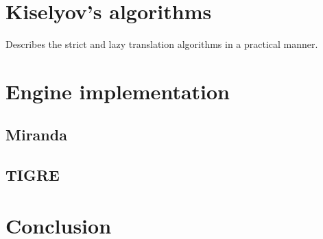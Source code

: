 \documentclass[conference]{IEEEtran}
\begin{document}
%

\section*{Kiselyov's algorithms}
Describes the strict and lazy translation algorithms in a practical manner.

\section*{Engine implementation}
\subsection*{Miranda}
\subsection*{TIGRE}

\section*{Conclusion}








\end{document}
